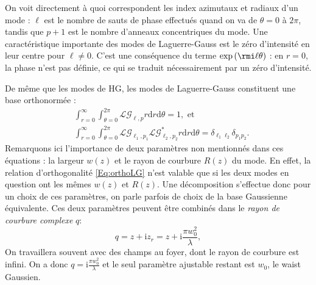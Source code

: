 On voit directement à quoi correspondent les index azimutaux et radiaux d'un mode : $\ell$ est le nombre de sauts de phase effectués quand on va de $\theta = 0$ à $2\pi$, tandis que $p+1$ est le nombre d'anneaux concentriques du mode.  Une caractéristique importante des modes de Laguerre-Gauss est le zéro d'intensité en leur centre pour $\ell \neq 0$. C'est une conséquence du terme $\exp{({\rmi}\ell \theta )}$ : en $r=0$, la phase n'est pas définie, ce qui se traduit nécessairement par un zéro d'intensité. 

De même que les modes de HG, les modes de Laguerre-Gauss constituent une base orthonormée : 
\begin{align}
&\int_{r=0}^{\infty}\int_{\theta=0}^{2\pi}{\mathcal{LG}_{\ell,p} r\mathrm{d}r\mathrm{d}\theta} = 1, \mbox{ et}\nonumber\\ 
&\int_{r=0}^{\infty}\int_{\theta=0}^{2\pi}{\mathcal{LG}_{\ell_1,p_1} \mathcal{LG}^{*}_{\ell_2,p_2} r\mathrm{d}r\mathrm{d}\theta} = \delta_{\ell_1\ell_2}\delta_{p_1p_2}.
\label{Eq:orthoLG}
\end{align}
Remarquons ici l'importance de deux paramètres non mentionnés dans ces équations : la largeur $w(z)$ et le rayon de courbure $R(z)$ du mode. En effet, la relation d'orthogonalité \ref{Eq:orthoLG} n'est valable que si les deux modes en question ont les mêmes $w(z)$ et $R(z)$. Une décomposition s'effectue donc pour un choix de ces paramètres, on parle parfois de choix de la base Gaussienne équivalente. Ces deux paramètres peuvent être combinés dans le \textit{rayon de courbure complexe} $q$:
\begin{equation*}
q = z + \mathrm{i}z_r = z + \mathrm{i}\frac{\pi w_0^2}{\lambda},
\end{equation*}
On travaillera souvent avec des champs au foyer, dont le rayon de courbure est infini. On a donc $q = \mathrm{i}\frac{\pi w_0^2}{\lambda}$ et le seul paramètre ajustable restant est $w_0$, le waist Gaussien.

